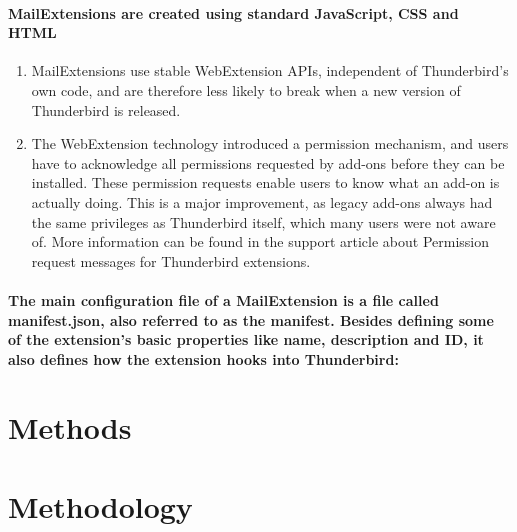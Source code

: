 \documentclass[12pt,a4paper]{article}
\begin{document}
\paragraph{MailExtensions are created using standard JavaScript, CSS and HTML}

\begin{enumerate}
\item MailExtensions use stable WebExtension APIs, independent of Thunderbird's own code, and are therefore less likely to break when a new version of Thunderbird is released.
\item The WebExtension technology introduced a permission mechanism, and users have to acknowledge all permissions requested by add-ons before they can be installed. These permission requests enable users to know what an add-on is actually doing. This is a major improvement, as legacy add-ons always had the same privileges as Thunderbird itself, which many users were not aware of. More information can be found in the support article about Permission request messages for Thunderbird extensions.
\end{enumerate}

\paragraph{The main configuration file of a MailExtension is a file called manifest.json, also referred to as the manifest. Besides defining some of the extension's basic properties like name, description and ID, it also defines how the extension hooks into Thunderbird:}




\section{Methods}



\section{Methodology} %

%
%
%  
%  
%
\end{document}
